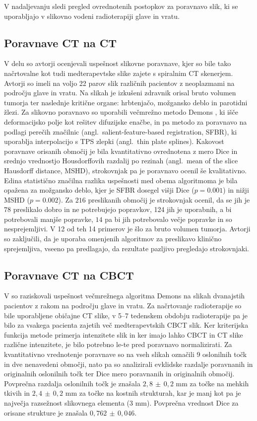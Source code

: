 \documentclass[journal]{IEEEtran}
\begin{document}
V nadaljevanju sledi pregled ovrednotenih postopkov za poravnavo slik, ki se uporabljajo v slikovno vodeni radioterapiji glave in vratu.

\subsection{Poravnave CT na CT}

V delu \cite{hardcastle2012} so avtorji ocenjevali uspešnost slikovne poravnave, kjer so bile tako načrtovalne kot tudi medterapevtske slike zajete s spiralnim CT skenerjem. Avtorji so imeli na voljo 22 parov slik različnih pacientov z neoplazmami na področju glave in vratu. Na slikah je izkušeni zdravnik orisal bruto volumen tumorja ter naslednje kritične organe: hrbtenjačo, možgansko deblo in parotidni žlezi. Za slikovno poravnavo so uporabili večmrežno metodo Demons \cite{vercauteren2009}, ki išče deformacijsko polje kot rešitev difuzijske enačbe, in pa metodo za poravnavo na podlagi perečih značilnic (angl.~salient-feature-based registration, SFBR), ki uporablja interpolacijo s TPS zlepki (angl.~thin plate splines). Kakovost poravnave orisanih območij je bila kvantitativno ovrednotena z mero Dice in srednjo vrednostjo Housdorffovih razdalij po rezinah (angl.~mean of the slice Hausdorff distance, MSHD), strokovnjak pa je poravnavo ocenil še kvalitativno. Edina statistično značilna razlika uspešnosti med obema algoritmoma je bila opažena za možgansko deblo, kjer je SFBR dosegel višji Dice ($p=0.001$) in nižji MSHD ($p=0.002$). Za $216$ preslikanih območij je strokovnjak ocenil, da se jih je $78$ preslikalo dobro in ne potrebujejo popravkov, 124 jih je uporabnih, a bi potrebovali manjše popravke, $14$ pa bi jih potrebovalo večje popravke in so nesprejemljivi. V 12 od teh 14 primerov je šlo za bruto volumen tumorja. Avtorji so zaključili, da je uporaba omenjenih algoritmov za preslikavo klinično sprejemljiva, vseeno pa predlagajo, da rezultate pazljivo pregledajo strokovnjaki.

\subsection{Poravnave CT na CBCT}

V \cite{hou2011} so raziskovali uspešnost večmrežnega algoritma Demons na slikah dvanajstih pacientov z rakom na področju glave in vratu. Za načrtovanje radioterapije so bile uporabljene običajne CT slike, v 5--7 tedenskem obdobju radioterapije pa je bilo za vsakega pacienta zajetih več medterapevtskih CBCT slik. Ker kriterijska funkcija metode primerja intenzitete slik in ker imajo lahko CBCT in CT slike različne intenzitete, je bilo potrebno le-te pred poravnavo normalizirati. Za kvantitativno vrednotenje poravnave so na vseh slikah označili 9 oslonilnih točk in dve nenavedeni območji, nato pa so analizirali evklidske razdalje poravnanih in originalnih oslonilnih točk ter Dice mero poravnanih in originalnih območij. Povprečna razdalja oslonilnih točk je znašala $2{,}8\,{\pm}\,0{,}2$ mm za točke na mehkih tkivih in $2{,}4\,{\pm}\,0{,}2$ mm za točke na kostnih strukturah, kar je manj kot pa je največja razsežnost slikovnega elementa ($3$ mm). Povprečna vrednost Dice za orisane strukture je znašala $0,762\,\pm\,0,046$.
\end{document}
